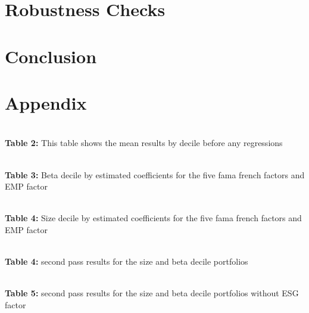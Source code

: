 \documentclass[12pt,oneside,reqno]{amsart}
\begin{document}
\section{Robustness Checks}
\label{Robustness}

\section{Conclusion}
\label{Conclusion}

{}

\singlespacing
{}

\section{Appendix}
\\
\textbf{Table 2:} This table shows the mean results by decile before any regressions\\
\vspace{1cm}


\begin{center}
\\
\textbf{Table 3:} Beta decile by estimated coefficients for the  five fama french factors and EMP factor\\
\end{center}
\vspace{1cm}
\begin{center}
\\
\textbf{Table 4:} Size decile by estimated coefficients for the  five fama french factors and EMP factor\\
\end{center}

\begin{center}
    \\
    \textbf{Table 4:} second pass results for the size and beta decile portfolios\\
\end{center}

\begin{center}
    \\
    \textbf{Table 5:} second pass results for the size and beta decile portfolios without ESG factor\\
\end{center}

\clearpage
\restoregeometry


%
\end{document}
